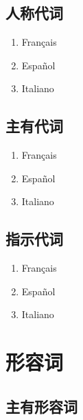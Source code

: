 \documentclass[UTF8,a4paper,titlepage,10pt]{report}
\begin{document}
\section{人称代词}
\label{sec:org3a92419}

\begin{enumerate}
\item Français
\label{sec:orgc2ad0dc}

\item Español
\label{sec:org682a9c9}

\item Italiano
\label{sec:org8660f4e}
\end{enumerate}

\section{主有代词}
\label{sec:org45f6f9d}

\begin{enumerate}
\item Français
\label{sec:org41921ea}

\item Español
\label{sec:orgf3d1446}

\item Italiano
\label{sec:org4eddbaa}
\end{enumerate}

\section{指示代词}
\label{sec:orga47fe09}

\begin{enumerate}
\item Français
\label{sec:orgc508b3e}

\item Español
\label{sec:org5fd0711}

\item Italiano
\label{sec:orga907de6}
\end{enumerate}

\chapter{形容词}
\label{sec:org5d06ba9}

\section{主有形容词}
\label{sec:orgcf7420c}
\end{document}

